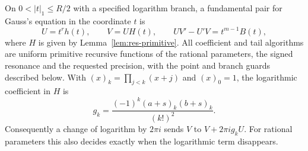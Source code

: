 \begin{theorem}
\label{thm:res-gauss}
On $0<|t|_1\le R/2$ with a specified logarithm branch, a fundamental pair
for Gauss's equation in the coordinate $t$ is
\[
 U=t^r h(t),\qquad V=U H(t),
 \qquad U V'-U' V=t^{m-1} B(t),
\]
where $H$ is given by Lemma~\ref{lem:res-primitive}. All coefficient and
tail algorithms are uniform primitive recursive functions of the rational
parameters, the signed resonance and the requested precision, with the
point and branch guards described below. With $(x)_k=\prod_{j<k}(x+j)$
and $(x)_0=1$, the logarithmic coefficient in $H$ is
\[
 \boxed{\displaystyle
 g_k=\frac{(-1)^k(a+s)_k(b+s)_k}{(k!)^2}.}
\]
Consequently a change of logarithm by $2\pi i$ sends $V$ to
$V+2\pi i g_k U$. For rational parameters this also decides exactly when
the logarithmic term disappears.
\end{theorem}

